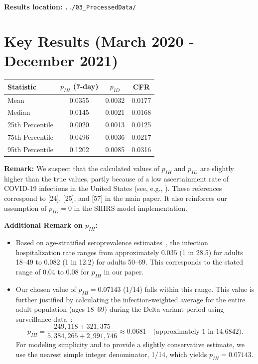 \documentclass[11pt]{article}
\begin{document}
\textbf{Results location:} \texttt{../03\_ProcessedData/}

\section{Key Results (March 2020 - December 2021)}

\begin{center}
\begin{tabular}{lccc}
\hline
\textbf{Statistic} & \textbf{$p_{IH}$ (7-day)} & \textbf{$p_{ID}$} & \textbf{CFR} \\
\hline
Mean & 0.0355 & 0.0032 & 0.0177 \\
Median & 0.0145 & 0.0021 & 0.0168 \\
25th Percentile & 0.0020 & 0.0013 & 0.0125 \\
75th Percentile & 0.0496 & 0.0036 & 0.0217 \\
95th Percentile & 0.1202 & 0.0085 & 0.0316 \\
\hline
\end{tabular}
\end{center}

\textbf{Remark:} We suspect that the calculated values of $p_{IH}$ and $p_{ID}$ are slightly higher than the true values, partly because of a low ascertainment rate of COVID-19 infections in the United States (see, e.g., \cite{Clarke2022, Deng2025, Reese2021}). These references correspond to [24], [25], and [57] in the main paper. It also reinforces our assumption of $p_{ID} = 0$ in the SIHRS model implementation.

\textbf{Additional Remark on $p_{IH}$:}
\begin{itemize}
    \item Based on age-stratified seroprevalence estimates~\cite{Deng2025}, the infection hospitalization rate ranges from approximately $0.035$ (1 in 28.5) for adults 18--49 to $0.082$ (1 in 12.2) for adults 50--69. This corresponds to the stated range of $0.04$ to $0.08$ for $p_{IH}$ in our paper.

    \item Our chosen value of $p_{IH} = 0.07143$ (1/14) falls within this range. This value is further justified by calculating the infection-weighted average for the entire adult population (ages 18--69) during the Delta variant period using surveillance data~\cite{Deng2025}:
    \[
    p_{IH} = \frac{249,\!118 + 321,\!375}{5,\!384,\!265 + 2,\!991,\!746} \approx 0.0681 \quad \text{(approximately 1 in 14.6842)}.
    \]
    For modeling simplicity and to provide a slightly conservative estimate, we use the nearest simple integer denominator, 1/14, which yields $p_{IH} = 0.07143$.
\end{itemize}
\end{document}
